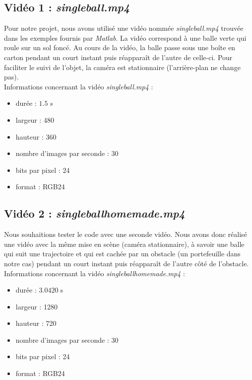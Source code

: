 \subsection{Vidéo 1 : \emph{singleball.mp4}}

Pour notre projet, nous avons utilisé une vidéo nommée \emph{singleball.mp4} trouvée dans les exemples fournis par \emph{Matlab}. La vidéo correspond à une balle verte qui roule sur un sol foncé. Au cours de la vidéo, la balle passe sous une boîte en carton pendant un court instant puis réapparaît de l'autre de celle-ci. Pour faciliter le suivi de l'objet, la caméra est stationnaire (l'arrière-plan ne change pas). \\

Informations concernant la vidéo \emph{singleball.mp4} :
\begin{itemize}
\item[] durée : $ 1.5 \; s $
\item[]	largeur : 480
\item[] hauteur : 360
\item[]	nombre d'images par seconde : 30
\item[] bits par pixel : 24
\item[] format : RGB24
\end{itemize}

\subsection{Vidéo 2 : \emph{singleballhomemade.mp4}}

Nous souhaitions tester le code avec une seconde vidéo. Nous avons donc réalisé une vidéo avec la même mise en scène (caméra stationnaire), à savoir une balle qui suit une trajectoire et qui est cachée par un obstacle (un portefeuille dans notre cas) pendant un court instant puis réapparaît de l'autre côté de l'obstacle.  \\

Informations concernant la vidéo \emph{singleballhomemade.mp4} :
\begin{itemize}
\item[] durée : $ 3.0420 \ s $
\item[]	largeur : 1280
\item[] hauteur : 720
\item[]	nombre d'images par seconde : 30
\item[] bits par pixel : 24
\item[] format : RGB24 \\
\end{itemize}

